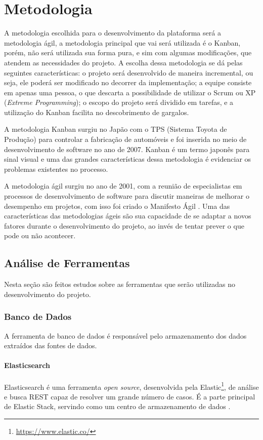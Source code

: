 \chapter[Metodologia]{Metodologia}
A metodologia escolhida para o desenvolvimento da plataforma será a metodologia ágil, a metodologia principal que vai será utilizada é o Kanban, porém, não será utilizada sua forma pura, e sim com algumas modificações, que atendem as necessidades do projeto. A escolha dessa metodologia se dá pelas seguintes características: o projeto será desenvolvido de maneira incremental, ou seja, ele poderá ser modificado no decorrer da implementação; a equipe consiste em apenas uma pessoa, o que descarta a possibilidade de utilizar o Scrum ou XP (\textit{Extreme Programming}); o escopo do projeto será dividido em tarefas, e a utilização do Kanban facilita no descobrimento de gargalos.

A metodologia Kanban surgiu no Japão com o TPS (Sistema Toyota de Produção) \cite{tps} para controlar a fabricação de automóveis e foi inserida no meio de desenvolvimento de software no ano de 2007. Kanban é um termo japonês para sinal visual e uma das grandes características dessa metodologia é evidenciar os problemas existentes no processo. 

A metodologia ágil surgiu no ano de 2001, com a reunião de especialistas em processos de desenvolvimento de software para discutir maneiras de melhorar o desempenho em projetos, com isso foi criado o Manifesto Ágil \cite{agil}. Uma das características das metodologias ágeis são sua capacidade de se adaptar a novos fatores durante o desenvolvimento do projeto, ao invés de tentar prever o que pode ou não acontecer.

\section{Análise de Ferramentas}
Nesta seção são feitos estudos sobre as ferramentas que serão utilizadas no desenvolvimento do projeto.
\subsection{Banco de Dados}
A ferramenta de banco de dados é responsável pelo armazenamento dos dados extraídos das fontes de dados.
\subsubsection*{Elasticsearch}
Elasticsearch é uma ferramenta \textit{open source}, desenvolvida pela Elastic\footnote[1]{\url{https://www.elastic.co/}}, de análise e busca REST capaz de resolver um grande número de casos. É a parte principal de Elastic Stack, servindo como um centro de armazenamento de dados \cite{elasticsearch}.

